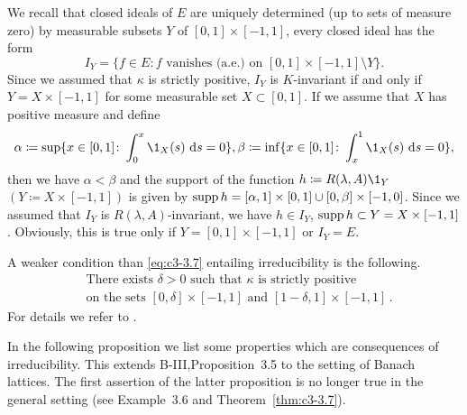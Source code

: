 \begin{examples}
\begin{enumerate}[(a), wide]
	We recall that closed ideals of $E$ are uniquely determined (up to sets of measure zero) by measurable subsets $Y$ of $[0,1]\times[-1,1]$, \ie  every closed ideal has the form
	\[
		I_{Y} = \{f \in E \colon f \text{ vanishes (a.e.) on } [0,1]\times[-1,1] \setminus Y\}.
	\]
	Since we assumed that $\kappa$ is strictly positive, $I_{Y}$ is $K$-invariant if and only if $Y = X\times[-1,1]$ for some measurable set $X \subset [0,1]$.
	If we assume that $X$ has positive measure and define
	\[
	\alpha \coloneqq \sup\{x \in [0,1] \colon \int_{0}^{x} \1_{X}(s)\,\ds = 0\}, \beta \coloneqq \inf\{x \in [0,1] \colon \int_{x}^{1} \1_{X}(s)\,\ds = 0\},
	\] 
	then we have $\alpha < \beta$ and the support of the function $h \coloneqq R(\lambda,A)\1_{Y}$
	$(Y \coloneqq X\times[-1,1])$ is given by $\mathop{}\!\mathrm{supp}\, h = [\alpha,1]\times[0,1] \cup [0,\beta]\times[-1,0]$.
	Since we assumed that $I_{Y}$ is $R(\lambda,A)$-invariant, we have $h \in I_{Y}$, \ie  $\mathop{}\!\mathrm{supp}\, h \subset Y = X\times[-1,1]$.
	Obviously, this is true only if $Y = [0,1]\times[-1,1]$ or $I_{Y} = E$.
	
	A weaker condition than \eqref{eq:c3-3.7} entailing irreducibility is the following.
	\begin{equation}\label{eq:c3-3.8}
		\begin{aligned}
		&\text{There exists } \delta > 0 \text{ such that } \kappa \text{ is strictly positive}\\
		&\text{on the sets } [0,\delta]\times[-1,1] \text{ and } [1-\delta,1]\times[-1,1]\,.
		\end{aligned}
	\end{equation}
	For details we refer to \citet{greiner:1984d}
    \marginpar{[Greiner (1984d)]}.
	\end{enumerate}	
\end{examples}
	
In the following proposition we list some properties which are conse­quences of irreducibility. This extends B-III,Proposition~3.5 to the setting of Banach lattices. The first assertion of the latter proposition is no longer true in the general setting (see Example~3.6 and Theorem~\ref{thm:c3-3.7}). 


